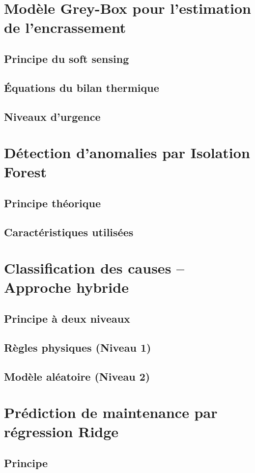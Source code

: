 \documentclass[12pt,a4paper]{report}
\begin{document}
\section{Modèle Grey-Box pour l'estimation de l'encrassement}
\subsection{Principe du soft sensing}
\subsection{Équations du bilan thermique}
\subsection{Niveaux d'urgence}
\section{Détection d'anomalies par Isolation Forest}
\subsection{Principe théorique}
\subsection{Caractéristiques utilisées}
\section{Classification des causes -- Approche hybride}
\subsection{Principe à deux niveaux}
\subsection{Règles physiques (Niveau 1)}
\subsection{Modèle aléatoire (Niveau 2)}
\section{Prédiction de maintenance par régression Ridge}
\subsection{Principe}
\end{document}
